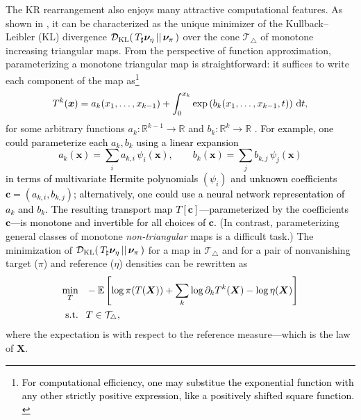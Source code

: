 \documentclass[twoside,11pt]{article}
\newcommand{\Ex}{\mathbb{E}}                                                   %
\newcommand{\push}{_\sharp}                                      %
\newcommand{\genm}{\boldsymbol{\nu} }   %
\newcommand{\re}{\mathbb{R}}
\newcommand{\ra}{\rightarrow}
\newcommand{\Xb}{\boldsymbol{X}}
\newcommand{\xb}{\boldsymbol{x}}
\newcommand{\cb}{\boldsymbol{c}}
\newcommand{\Dkl}{\mathcal{D}_{\rm KL}}         %
\newcommand{\spaceMapT}{\mathcal{T}_\triangle}  %
\newcommand{\hrevone}{\textcolor{black} }
\begin{document}
The KR rearrangement also enjoys many attractive
computational features.  As shown in
%
\citet{marzouk2016introduction}, it can be characterized
as the unique minimizer of the Kullback--Leibler (KL) divergence
$\Dkl(\,T\push \genm_{\eta} \,\vert\vert \, \genm_{\pi} \, )$ over the cone
$\spaceMapT$ of monotone increasing triangular maps.
%
%
%
%
%
%
From the perspective of function approximation, 
parameterizing a monotone triangular map
is straightforward: it suffices to write each
component of the map as\footnote{\hrevone{For computational
efficiency, one may substitue the exponential function with any other strictly positive expression, like a positively shifted square function.
}
}
\begin{equation} \label{eq:monotone}
  T^k(\xb)= a_k(x_1,\ldots,x_{k-1}) + 
  \int_0^{x_k} \exp \left ( b_k(x_1,\ldots,x_{k-1}, t) \right )\, {\rm d} t,
\end{equation}
%
for some arbitrary functions $a_k:\re^{k-1}\ra\re$ and
$b_k:\re^{k}\ra\re$
%
%
\citep{ramsay1998estimating}.
\hrevone{ 
For example,
one could parameterize each 
%
$a_k,b_k$ using a 
linear expansion 
\begin{equation}
  a_k(\xb) = \sum_i a_{k,i} \,\psi_i(\xb),\qquad
  b_k(\xb) = \sum_j b_{k,j} \,\psi_j(\xb)
\end{equation}
in terms of multivariate 
Hermite polynomials $(\psi_i)$ and unknown 
coefficients $\cb=(a_{k,i}, b_{k,j})$; alternatively, one could use
a neural network representation of
$a_k$ and $b_k$.
The resulting transport map $T[\cb]$---parameterized by  
the coefficients $\cb$---is monotone and invertible
for all choices of $\cb$.  
}
(In
contrast, parameterizing general classes of monotone
\textit{non-triangular} maps is a difficult task.)
%
%
%
%
%
%
%
%
%
%
%
The minimization of
$\Dkl(\,T\push \genm_{\eta} \,\vert\vert \, \genm_{\pi} \, )$ for a map in
$\spaceMapT$ and for a pair of nonvanishing target ($\pi$) and
reference ($\eta$) densities  can be rewritten as
%
%
%
%
%
%
%
%
%
%
%
%
\begin{align}  \label{OptimDirect}
      \min\limits_T     &\phantom{=}  -\Ex \left [ \log \pi(T(\Xb)) + 
      \sum_k \log \partial_k T^k(\Xb)
      - \log \eta(\Xb) \right ]   \\
      {\rm s.t.}      &\phantom{=}  T \in \spaceMapT,       \nonumber
\end{align}
%
where 
%
%
%
%
%
%
%
%
%
%
the expectation is 
%
with respect to
the reference measure---which is the law of
$\Xb$. 
%
%
%
%
%
%
%
%
%
%
%
%
%
%
%
\end{document}
